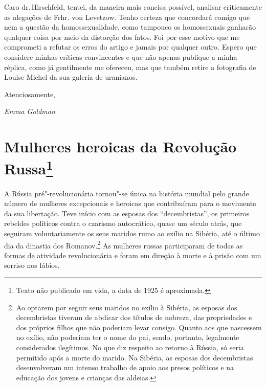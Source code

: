 Caro dr.\,Hirschfeld, tentei, da maneira mais concisa possível, analisar
criticamente as alegações de Frhr. von Levetzow. Tenho certeza que
concordará comigo que nem a questão da homossexualidade, como tampouco
os homossexuais ganharão qualquer coisa por meio da distorção dos fatos.
Foi por esse motivo que me comprometi a refutar os erros do artigo e
jamais por qualquer outro. Espero que considere minhas críticas
convincentes e que não apenas publique a minha réplica, como já
gentilmente me ofereceu, mas que também retire a fotografia de Louise
Michel da sua galeria de uranianos.

\smallskip

Atenciosamente,

\smallskip

\textit{Emma Goldman}




\chapter{Mulheres heroicas da Revolução Russa\footnote{Texto não publicado em
  vida, a data de 1925 é aproximada.}}

A Rússia pré"-revolucionária tornou"-se única na história mundial pelo
grande número de mulheres excepcionais e heroicas que contribuíram para
o movimento da sua libertação. Teve início com as esposas dos
``decembristas'', os primeiros rebeldes políticos contra o czarismo
autocrático, quase um século atrás, que seguiram voluntariamente os
seus maridos rumo ao exílio na Sibéria, até o último dia da dinastia dos
Romanov.\footnote{Ao optarem por seguir seus maridos no exílio à
  Sibéria, as esposas dos decembristas tiveram de abdicar dos títulos de
  nobreza, das propriedades e dos próprios filhos que não poderiam levar consigo. Quanto aos que nascessem no exílio, não poderiam ter o nome do
  pai, sendo, portanto, legalmente considerados ilegítimos. No que diz respeito ao retorno à Rússia, só seria permitido
  após a morte do marido. Na Sibéria, as esposas dos decembristas desenvolveram um intenso trabalho de apoio aos presos políticos e na educação dos jovens e crianças das
  aldeias.} As mulheres russas participaram de todas as formas de
atividade revolucionária e foram em direção à morte e à prisão com um
sorriso nos lábios.

